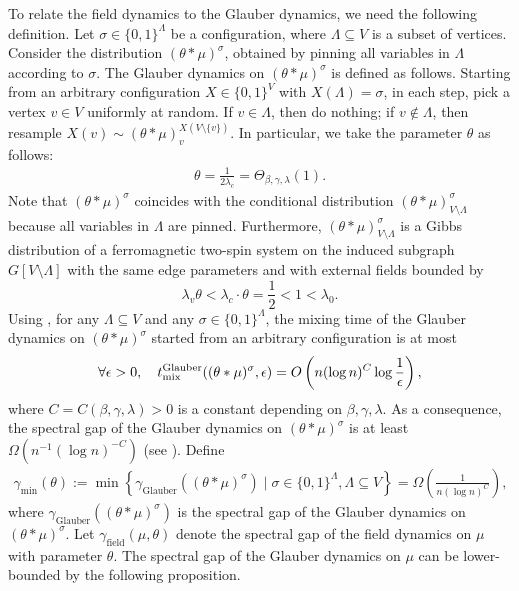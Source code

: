 \documentclass[11pt]{amsart}
\newcommand{\tp}[1]{{\left( #1 \right)}}
\newcommand{\defeq}{:=}
\theoremstyle{definition}
\theoremstyle{remark}
\begin{document}
To relate the field dynamics to the Glauber dynamics, we need the following definition. Let $\sigma \in \{0,1\}^\Lambda$ be a configuration, where $\Lambda \subseteq V$ is a subset of vertices. Consider the distribution $(\theta * \mu)^\sigma$, obtained by pinning all variables in $\Lambda$ according to $\sigma$. The Glauber dynamics on $(\theta * \mu)^\sigma$ is defined as follows. Starting from an arbitrary configuration $X \in \{0,1\}^{V}$ with $X(\Lambda) = \sigma$, in each step, pick a vertex $v \in V$ uniformly at random. If $v \in \Lambda$, then do nothing; if $v \notin \Lambda$, then resample
$X(v) \sim (\theta * \mu)^{X(V \setminus \{v\})}_v$.
In particular, we take the parameter $\theta$ as follows:
\begin{align}\label{eq:theta-definition}
\theta = \frac{1}{2\lambda_c} = \Theta_{\beta,\gamma,\lambda}(1).
\end{align}
Note that $(\theta * \mu)^\sigma$ coincides with the conditional distribution $(\theta * \mu)^\sigma_{V \setminus \Lambda}$ because all variables in $\Lambda$ are pinned. Furthermore, $(\theta * \mu)^\sigma_{V \setminus \Lambda}$ is a Gibbs distribution of a ferromagnetic two-spin system on the induced subgraph $G[V \setminus \Lambda]$ with the same edge parameters and with external fields bounded by
\[
\lambda_v \theta < \lambda_c \cdot \theta = \frac{1}{2} < 1 < \lambda_0.
\]
Using , for any $\Lambda \subseteq V$ and any $\sigma \in \{0,1\}^\Lambda$, the mixing time of the Glauber dynamics on $(\theta * \mu)^\sigma$ started from an arbitrary configuration is at most
\begin{align*}
 \forall \epsilon > 0, \quad t_{\textnormal{mix}}^{\textnormal{Glauber}}((\theta * \mu)^\sigma,\epsilon) = O\left(n (\log n)^{C} \log \frac{1}{\epsilon}\right),
\end{align*}
where $C = C(\beta,\gamma,\lambda) > 0$ is a constant depending on $\beta,\gamma,\lambda$. 
As a consequence, the spectral gap of the Glauber dynamics on $(\theta * \mu)^\sigma$ is at least $\Omega(n^{-1} (\log n)^{-C})$ (see \cite[Theorem 12.5]{LP17}).
Define 
\begin{align}\label{eq:gamma-min-theta}
\gamma_{\text{min}}^{}(\theta) \defeq \min\left\{  \gamma_{\text{Glauber}}^{}((\theta * \mu)^\sigma) \mid \sigma \in \{0,1\}^\Lambda, \Lambda \subseteq V \right\} = \Omega \tp{\frac{1}{n (\log n)^{C}}},
\end{align} 
where $\gamma_{\text{Glauber}}^{}((\theta * \mu)^\sigma)$ is the spectral gap of the Glauber dynamics on $(\theta * \mu)^\sigma$.
Let $\gamma_{\text{field}}^{}(\mu,\theta)$ denote the spectral gap of the field dynamics on $\mu$ with parameter $\theta$. The spectral gap of the Glauber dynamics on $\mu$ can be lower-bounded by the following proposition.
\end{document}
